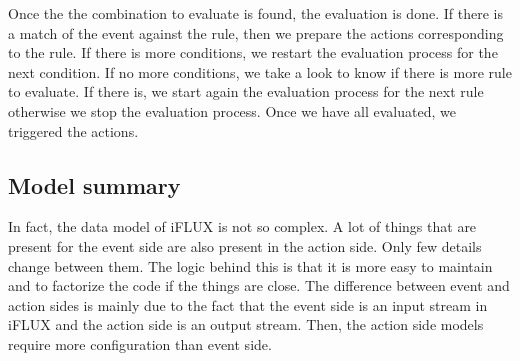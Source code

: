 Once the the combination to evaluate is found, the evaluation is done. If there is a match of the event against the rule, then we prepare the actions corresponding to the rule. If there is more conditions, we restart the evaluation process for the next condition. If no more conditions, we take a look to know if there is more rule to evaluate. If there is, we start again the evaluation process for the next rule otherwise we stop the evaluation process. Once we have all evaluated, we triggered the actions.

\subsection{Model summary}

In fact, the data model of iFLUX is not so complex. A lot of things that are present for the event side are also present in the action side. Only few details change between them. The logic behind this is that it is more easy to maintain and to factorize the code if the things are close. The difference between event and action sides is mainly due to the fact that the event side is an input stream in iFLUX and the action side is an output stream. Then, the action side models require more configuration than event side.



















